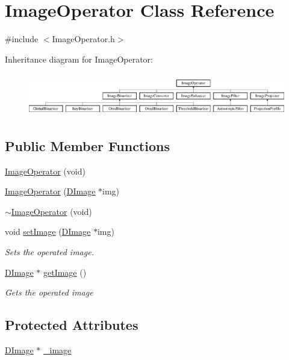 \hypertarget{class_image_operator}{\section{Image\+Operator Class Reference}
\label{class_image_operator}
}


{\ttfamily \#include $<$Image\+Operator.\+h$>$}

Inheritance diagram for Image\+Operator\+:\begin{figure}[H]
\begin{center}
\leavevmode
\includegraphics[height=1.889764cm]{class_image_operator}
\end{center}
\end{figure}
\subsection*{Public Member Functions}
\begin{DoxyCompactItemize}
\item 
\hyperlink{class_image_operator_ad51aedea73c2392a53dac0f359d67734}{Image\+Operator} (void)
\item 
\hyperlink{class_image_operator_aa21a419edd1071392438c98fec2bbb6b}{Image\+Operator} (\hyperlink{class_d_image}{D\+Image} $\ast$img)
\item 
\hyperlink{class_image_operator_a381d5ddd708a43730d9b0545b5fedff5}{$\sim$\+Image\+Operator} (void)
\item 
void \hyperlink{class_image_operator_a5b4f0975dabbfb1098d975dd238aa5d6}{set\+Image} (\hyperlink{class_d_image}{D\+Image} $\ast$img)
\begin{DoxyCompactList}\small\item\em Sets the operated image. \end{DoxyCompactList}\item 
\hyperlink{class_d_image}{D\+Image} $\ast$ \hyperlink{class_image_operator_a71271114184aa4d9fe21c903687b55a5}{get\+Image} ()
\begin{DoxyCompactList}\small\item\em Gets the operated image \end{DoxyCompactList}\end{DoxyCompactItemize}
\subsection*{Protected Attributes}
\begin{DoxyCompactItemize}
\item 
\hyperlink{class_d_image}{D\+Image} $\ast$ \hyperlink{class_image_operator_a096f8347c28e3c3e932d4bfe0fb33472}{\+\_\+image}
\end{DoxyCompactItemize}


